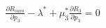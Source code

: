 \documentclass[preview]{standalone}
\begin{document}
\begin{align*}
\frac{\partial {R_{sum}}}{\partial {p_3}} - \lambda^\ast + \mu_3^\ast \frac{\partial {R_3}}{\partial {p_3}}= 0
\end{align*}
\end{document}
